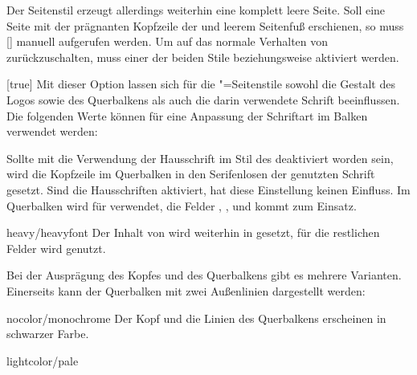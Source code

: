 \begin{Declaration*}{}
\begin{Declaration*}{}
\begin{Declaration*}{}
\begin{Declaration}[v2.02]{}
\begin{Declaration}[v2.02]{}
\begin{Declaration}[v2.02]{}
Der Seitenstil  erzeugt allerdings weiterhin eine komplett 
leere Seite. Soll eine Seite mit der prägnanten Kopfzeile der \TnUD und leerem 
Seitenfuß erschienen, so muss [] 
manuell aufgerufen werden. Um auf das normale Verhalten von \KOMAScript{} 
zurückzuschalten, muss einer der beiden Stile  
beziehungsweise  aktiviert werden.
%
\end{Declaration}
\end{Declaration}
\end{Declaration}

\begin{Declaration}[%
  v2.03;%
  v2.04!\Option{cdhead=barcolor}:nur farbig abgesetzter Querbalken;%
  v2.05!\Option{cdhead=date}:Datum zwischen Kopf- und Textbereich;%
]{}[true]
\printdeclarationlist%
%
%
%
%
%
Mit dieser Option lassen sich für die "=Seitenstile 
sowohl die Gestalt des Logos sowie des Querbalkens als auch die darin 
verwendete Schrift beeinflussen. Die folgenden Werte können für eine Anpassung 
der Schriftart im Balken verwendet werden:
%
\begin{values}{}
\itemfalse
  Sollte mit  die Verwendung der Hausschrift im Stil des 
  \TUDCDs deaktiviert worden sein, wird die Kopfzeile im Querbalken in den 
  Serifenlosen der genutzten Schrift gesetzt. Sind die Hausschriften aktiviert, 
  hat diese Einstellung keinen Einfluss.
  Im Querbalken wird für   verwendet, 
  die Felder , ,  und 
   kommt  zum Einsatz.
\item[heavy/heavyfont]
  Der Inhalt von  wird weiterhin in  
  gesetzt, für die restlichen Felder wird  genutzt.
\end{values}
%
Bei der Ausprägung des Kopfes und des Querbalkens gibt es mehrere Varianten. 
Einerseits kann der Querbalken mit zwei Außenlinien dargestellt werden:
%
\begin{values}{}
\item[nocolor/monochrome]
  Der Kopf und die Linien des Querbalkens erscheinen in schwarzer Farbe.
\item[lightcolor/pale]

\end{values}
\end{Declaration}
\end{Declaration*}
\end{Declaration*}
\end{Declaration*}
